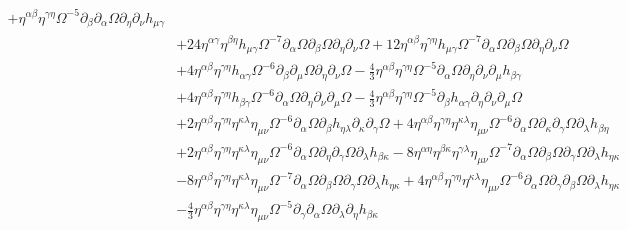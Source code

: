 \documentclass[10pt,letterpaper]{article}
\begin{document}
\begin{align}
 + \eta^{\alpha \beta} \eta^{\gamma \eta} \Omega^{-5} \partial_{\beta}\partial_{\alpha}\Omega \partial_{\eta}\partial_{\nu}h_{\mu \gamma}\nonumber\\
& + 24 \eta^{\alpha \gamma} \eta^{\beta \eta} h_{\mu \gamma} \Omega^{-7} \partial_{\alpha}\Omega \partial_{\beta}\Omega \partial_{\eta}\partial_{\nu}\Omega
 + 12 \eta^{\alpha \beta} \eta^{\gamma \eta} h_{\mu \gamma} \Omega^{-7} \partial_{\alpha}\Omega \partial_{\beta}\Omega \partial_{\eta}\partial_{\nu}\Omega\nonumber\\
& + 4 \eta^{\alpha \beta} \eta^{\gamma \eta} h_{\alpha \gamma} \Omega^{-6} \partial_{\beta}\partial_{\mu}\Omega \partial_{\eta}\partial_{\nu}\Omega
 -  \tfrac{4}{3} \eta^{\alpha \beta} \eta^{\gamma \eta} \Omega^{-5} \partial_{\alpha}\Omega \partial_{\eta}\partial_{\nu}\partial_{\mu}h_{\beta \gamma}\nonumber\\
& + 4 \eta^{\alpha \beta} \eta^{\gamma \eta} h_{\beta \gamma} \Omega^{-6} \partial_{\alpha}\Omega \partial_{\eta}\partial_{\nu}\partial_{\mu}\Omega
 -  \tfrac{4}{3} \eta^{\alpha \beta} \eta^{\gamma \eta} \Omega^{-5} \partial_{\beta}h_{\alpha \gamma} \partial_{\eta}\partial_{\nu}\partial_{\mu}\Omega\nonumber\\
& + 2 \eta^{\alpha \beta} \eta^{\gamma \eta} \eta^{\kappa \lambda} \eta_{\mu \nu} \Omega^{-6} \partial_{\alpha}\Omega \partial_{\beta}h_{\eta \lambda} \partial_{\kappa}\partial_{\gamma}\Omega
 + 4 \eta^{\alpha \beta} \eta^{\gamma \eta} \eta^{\kappa \lambda} \eta_{\mu \nu} \Omega^{-6} \partial_{\alpha}\Omega \partial_{\kappa}\partial_{\gamma}\Omega \partial_{\lambda}h_{\beta \eta}\nonumber\\
& + 2 \eta^{\alpha \beta} \eta^{\gamma \eta} \eta^{\kappa \lambda} \eta_{\mu \nu} \Omega^{-6} \partial_{\alpha}\Omega \partial_{\eta}\partial_{\gamma}\Omega \partial_{\lambda}h_{\beta \kappa}
 - 8 \eta^{\alpha \eta} \eta^{\beta \kappa} \eta^{\gamma \lambda} \eta_{\mu \nu} \Omega^{-7} \partial_{\alpha}\Omega \partial_{\beta}\Omega \partial_{\gamma}\Omega \partial_{\lambda}h_{\eta \kappa}\nonumber\\
& - 8 \eta^{\alpha \beta} \eta^{\gamma \eta} \eta^{\kappa \lambda} \eta_{\mu \nu} \Omega^{-7} \partial_{\alpha}\Omega \partial_{\beta}\Omega \partial_{\gamma}\Omega \partial_{\lambda}h_{\eta \kappa}
 + 4 \eta^{\alpha \beta} \eta^{\gamma \eta} \eta^{\kappa \lambda} \eta_{\mu \nu} \Omega^{-6} \partial_{\alpha}\Omega \partial_{\gamma}\partial_{\beta}\Omega \partial_{\lambda}h_{\eta \kappa}\nonumber\\
& -  \tfrac{4}{3} \eta^{\alpha \beta} \eta^{\gamma \eta} \eta^{\kappa \lambda} \eta_{\mu \nu} \Omega^{-5} \partial_{\gamma}\partial_{\alpha}\Omega \partial_{\lambda}\partial_{\eta}h_{\beta \kappa}

\end{align}
\end{document}
